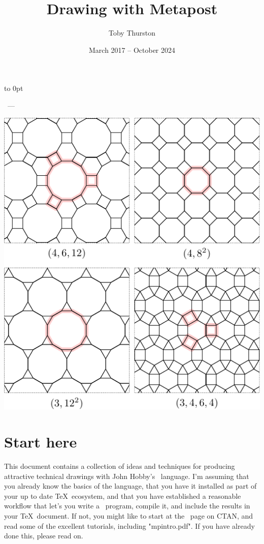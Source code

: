\documentclass[a4paper,landscape]{article}
\title{Drawing with Metapost}
\author{Toby Thurston}
\date{March 2017 – October 2024}
\begin{document}
\let\folio\thepage
\renewcommand{\thepage}{\rlap{\hbox to 5in{\hss\small\folio}}}
\pagestyle{myheadings}
\raggedbottom
\makeatletter
\moveright 6in\vbox to
0pt{\vskip23pt\noindent\sffamily{\Large\bfseries\@title}\par\bigskip
    \noindent\@author\ --- \@date\par
    \bigskip\noindent
    \includegraphics{tiling-archimedes}
\vss}
\makeatother
\thispagestyle{empty}
\section{Start here}

This document contains a collection of ideas and techniques for producing attractive
technical drawings with John Hobby’s \MP\ language.  I’m assuming that you already
know the basics of the language, that you have it installed as part of your up to
date \TeX\ ecosystem, and that you have established a reasonable workflow that
let’s you write a \MP\ program, compile it, and include the results in your
\TeX\ document.  If not, you might like to start at the \MP\ page on CTAN, and read
some of the excellent tutorials, including "mpintro.pdf".  If you have already done
this, please read on.
\end{document}
